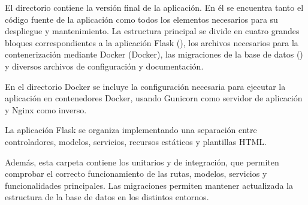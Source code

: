 El directorio  contiene la versión final de la aplicación. En él se encuentra tanto el código fuente de la aplicación como todos los elementos necesarios para su despliegue y mantenimiento. La estructura principal se divide en cuatro grandes bloques correspondientes a la aplicación Flask (), los archivos necesarios para la contenerización mediante Docker (Docker), las migraciones de la base de datos () y diversos archivos de configuración y documentación.

\vspace{0.5cm} 
{\footnotesize
{}}

En el directorio Docker se incluye la configuración necesaria para ejecutar la aplicación en contenedores Docker, usando Gunicorn como servidor de aplicación y Nginx como  inverso.

\vspace{0.5cm} 
{\footnotesize
{}}
\vspace{0.2cm}

La aplicación Flask se organiza implementando una separación entre controladores, modelos, servicios, recursos estáticos y plantillas HTML. 

Además, esta carpeta contiene los  unitarios y de integración, que permiten comprobar el correcto funcionamiento de las rutas, modelos, servicios y funcionalidades principales. Las migraciones permiten mantener actualizada la estructura de la base de datos en los distintos entornos.

